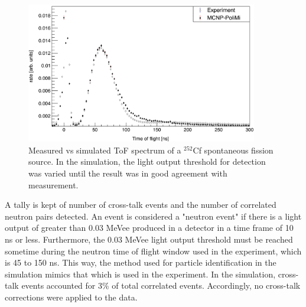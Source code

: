 \begin{figure}
    \centering
    \includegraphics[width = 0.9\textwidth]{Content/Methods/Cf252MCNPVsEXP.png}
    \caption{Measured vs simulated ToF spectrum of a $^{252}$Cf spontaneous fission source.
    In the simulation, the light output threshold for detection was varied until the result was in good agreement with measurement.}
    \label{fig:Cf252MCNPVsEXP}
\end{figure}
A tally is kept of number of cross-talk events and the number of correlated neutron pairs detected.
An event is considered a "neutron event" if there is a light output of greater than 0.03 MeVee produced in a detector in a time frame of 10 ns or less.
Furthermore, the 0.03 MeVee light output threshold must be reached sometime during the neutron time of flight window used in the experiment, which is 45 to 150 ns.
This way, the method used for particle identification in the simulation mimics that which is used in the experiment.
In the simulation, cross-talk events accounted for 3\% of total correlated events.
Accordingly, no cross-talk corrections were applied to the data.

